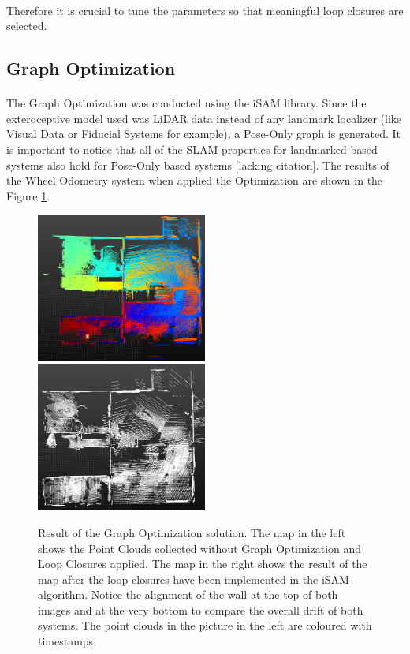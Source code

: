 \documentclass[11pt]{article}
\begin{document}
	\paragraph{}
	Therefore it is crucial to tune the parameters so that meaningful loop closures are selected. 

	\subsection{Graph Optimization}
	\paragraph{}
	The Graph Optimization was conducted using the iSAM library. Since the exteroceptive model used was LiDAR data instead of any landmark localizer (like Visual Data or Fiducial Systems for example), a Pose-Only graph is generated. It is important to notice that all of the SLAM properties for landmarked based systems also hold for Pose-Only based systems [lacking citation].
	The results of the Wheel Odometry system when applied the Optimization are shown in the Figure \ref{fig:GraphOptimization1}.
		
	\begin{figure}
		\includegraphics[width=0.5\textwidth]{ResultNoLoopClosure}
		\includegraphics[width=0.5\textwidth]{ResultLoopClosure}
		\caption{Result of the Graph Optimization solution. The map in the left shows the Point Clouds collected without Graph Optimization and Loop Closures applied. The map in the right shows the result of the map after the loop closures have been implemented in the iSAM algorithm. Notice the alignment of the wall at the top of both images and at the very bottom to compare the overall drift of both systems. The point clouds in the picture in the left are coloured with timestamps.}
		\label{fig:GraphOptimization1}	
	\end{figure}
	
\end{document}
